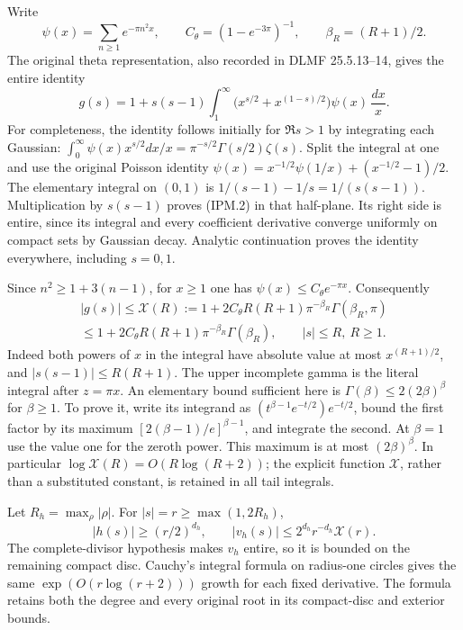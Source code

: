 \documentclass[11pt,a4paper]{article}
\theoremstyle{definition}
\begin{document}
Write
\[
 \psi(x)=\sum_{n\ge1}e^{-\pi n^2x},\qquad
 C_\theta=(1-e^{-3\pi})^{-1},\qquad
 \beta_R=(R+1)/2.
 \tag{IPM.1}
\]
The original theta representation, also recorded in DLMF 25.5.13--14,
gives the entire identity
\[
 g(s)=1+s(s-1)\int_1^\infty
       \bigl(x^{s/2}+x^{(1-s)/2}\bigr)\psi(x)\,\frac{dx}{x}.
 \tag{IPM.2}
\]
For completeness, the identity follows initially for \(\Re s>1\)
by integrating each Gaussian:
\(\int_0^\infty\psi(x)x^{s/2}dx/x
=\pi^{-s/2}\Gamma(s/2)\zeta(s)\).
Split the integral at one and use the original Poisson identity
\(\psi(x)=x^{-1/2}\psi(1/x)+(x^{-1/2}-1)/2\).
The elementary integral on \((0,1)\) is
\(1/(s-1)-1/s=1/(s(s-1))\). Multiplication by \(s(s-1)\)
proves (IPM.2) in that half-plane. Its right side is entire, since its
integral and every coefficient derivative converge uniformly on compact
sets by Gaussian decay. Analytic continuation proves the identity
everywhere, including \(s=0,1\).

Since \(n^2\ge1+3(n-1)\), for \(x\ge1\)
one has \(\psi(x)\le C_\theta e^{-\pi x}\). Consequently
\[
 \begin{gathered}
 |g(s)|\le\mathcal X(R):=
  1+2C_\theta R(R+1)\pi^{-\beta_R}\Gamma(\beta_R,\pi)\\
 \le 1+2C_\theta R(R+1)\pi^{-\beta_R}\Gamma(\beta_R),
 \qquad |s|\le R,\ R\ge1.
 \end{gathered}
 \tag{IPM.3}
\]
Indeed both powers of \(x\) in the integral have absolute value at most
\(x^{(R+1)/2}\), and \(|s(s-1)|\le R(R+1)\).
The upper incomplete gamma is the literal integral after \(z=\pi x\).
An elementary bound sufficient here is
\(\Gamma(\beta)\le2(2\beta)^\beta\) for \(\beta\ge1\).
To prove it, write its integrand as
\((t^{\beta-1}e^{-t/2})e^{-t/2}\), bound the first factor by
its maximum \([2(\beta-1)/e]^{\beta-1}\), and integrate the second.
At \(\beta=1\) use the value one for the zeroth power. This maximum
is at most \((2\beta)^\beta\). In particular
\(\log\mathcal X(R)=O(R\log(R+2))\); the explicit function
\(\mathcal X\), rather than a substituted constant, is retained in
all tail integrals.

Let \(R_h=\max_\rho|\rho|\). For \(|s|=r\ge\max(1,2R_h)\),
\[
 |h(s)|\ge(r/2)^{d_h},\qquad
 |v_h(s)|\le 2^{d_h}r^{-d_h}\mathcal X(r).
 \tag{IPM.4}
\]
The complete-divisor hypothesis makes \(v_h\) entire, so it is bounded
on the remaining compact disc. Cauchy's integral formula on radius-one
circles gives the same \(\exp(O(r\log(r+2)))\) growth for each fixed
derivative. The formula retains both the degree and every original root
in its compact-disc and exterior bounds.
\end{document}
